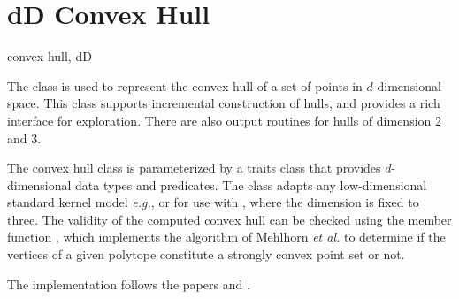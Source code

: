 \section{dD Convex Hull}
\begin{ccPackage}{convex hull, dD}
  
The class  is used to represent the
convex hull of a set of points in $d$-dimensional space.  This class
supports incremental construction of hulls, and provides a rich
interface for exploration. There are also output routines for hulls
of dimension 2 and 3.

The convex hull class is parameterized by a traits class that provides 
$d$-dimensional data types and predicates.  The class 
 adapts any low-dimensional standard kernel 
model \textit{e.g.},  or  for use 
with , where the dimension is fixed to three.
The validity of the computed convex hull can be checked using the
member function , which implements the algorithm
of Mehlhorn \textit{et al.}\cite{mnssssu-cgpvg-96} to determine if
the vertices of a given polytope constitute a strongly convex point
set or not.
  
The implementation follows the papers \cite{cms-frric-93} and
\cite{bms-dgc-94}.  

\end{ccPackage}


